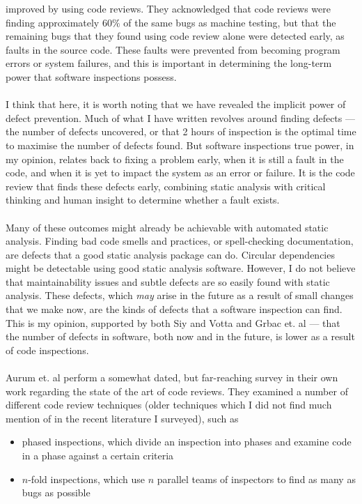 improved by using code reviews.
They acknowledged that code reviews were finding approximately 60$\%$ of the same bugs as machine testing, but
that the remaining bugs that they found using code review alone were detected early, as faults in
the source code.
These faults were prevented from becoming program errors or system failures, and this is important
in determining the long-term power that software inspections possess.\\
\\
I think that here, it is worth noting that we have revealed the implicit power of defect prevention.
Much of what I have written revolves around finding defects --- the number of defects uncovered, or
that 2 hours of inspection is the optimal time to maximise the number of defects found.
But software inspections true power, in my opinion, relates back to fixing a problem early, when it
is still a fault in the code, and when it is yet to impact the system as an error or failure.
It is the code review that finds these defects early, combining static analysis with critical
thinking and human insight to determine whether a fault exists.\\
\\
Many of these outcomes might already be achievable with automated static analysis.
Finding bad code smells and practices, or spell-checking documentation, are defects that a good
static analysis package can do.
Circular dependencies might be detectable using good static analysis software.
However, I do not believe that maintainability issues and subtle defects are so easily found with
static analysis.
These defects, which {\it may} arise in the future as a result of small changes that we make now,
are the kinds of defects that a software inspection can find.
This is my opinion, supported by both Siy and Votta \cite{siy2001does} and Grbac et. al
\cite{grbac2012quantifying} --- that the number of defects in software, both now and in the future,
is lower as a result of code inspections.\\
\\
Aurum et. al \cite{aurum2002state} perform a somewhat dated, but far-reaching survey in their own
work regarding the state of the art of code reviews.
They examined a number of different code review techniques (older techniques which I did not find
much mention of in the recent literature I surveyed), such as
\begin{itemize}
	\item phased inspections, which divide an inspection into phases and examine code in a phase
		against a certain criteria
	\item $n$-fold inspections, which use $n$ parallel teams of inspectors to find as many as bugs as
		possible
\end{itemize}

